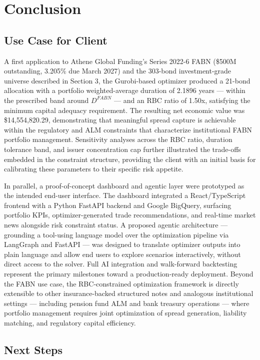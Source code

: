 \documentclass[12pt]{article}
\begin{document}
\section{Conclusion}

\subsection{Use Case for Client}

A first application to Athene Global Funding's Series 2022-6 FABN (\$500M outstanding, 3.205\% due March 2027) and the 303-bond investment-grade universe described in Section 3, the Gurobi-based optimizer produced a 21-bond allocation with a portfolio weighted-average duration of 2.1896 years — within the prescribed band around $D^{FABN}$ — and an RBC ratio of 1.50x, satisfying the minimum capital adequacy requirement. The resulting net economic value was \$14,554,820.29, demonstrating that meaningful spread capture is achievable within the regulatory and ALM constraints that characterize institutional FABN portfolio management. Sensitivity analyses across the RBC ratio, duration tolerance band, and issuer concentration cap further illustrated the trade-offs embedded in the constraint structure, providing the client with an initial basis for calibrating these parameters to their specific risk appetite.

In parallel, a proof-of-concept dashboard and agentic layer were prototyped as the intended end-user interface. The dashboard integrated a React/TypeScript frontend with a Python FastAPI backend and Google BigQuery, surfacing portfolio KPIs, optimizer-generated trade recommendations, and real-time market news alongside risk constraint status. A proposed agentic architecture — grounding a tool-using language model over the optimization pipeline via LangGraph and FastAPI — was designed to translate optimizer outputs into plain language and allow end users to explore scenarios interactively, without direct access to the solver. Full AI integration and walk-forward backtesting represent the primary milestones toward a production-ready deployment. Beyond the FABN use case, the RBC-constrained optimization framework is directly extensible to other insurance-backed structured notes and analogous institutional settings — including pension fund ALM and bank treasury operations — where portfolio management requires joint optimization of spread generation, liability matching, and regulatory capital efficiency.

\subsection{Next Steps}
\end{document}
